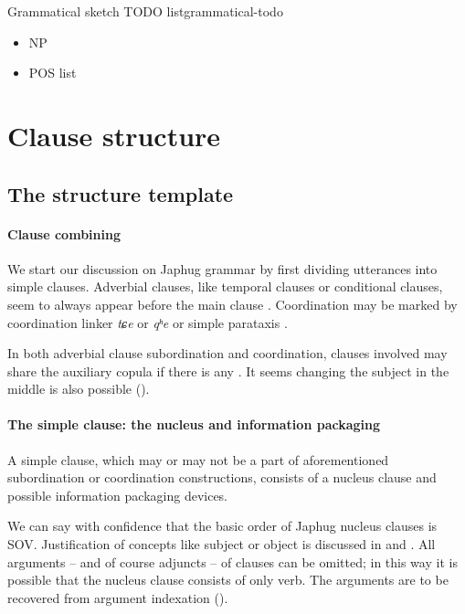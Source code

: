 \documentclass[a4paper, oneside, 12pt]{report}
\newcommand*{\citesec}[1]{\S~{#1}}
\newcommand*{\citechap}[1]{Ch~{#1}}
\newcommand*{\citepage}[1]{p.~{#1}}
\newcommand{\form}[1]{\emph{#1}}
\begin{document}
\begin{todobox}{Grammatical sketch TODO list}{grammatical-todo}
    \begin{itemize}
        \item NP
        \item POS list
    \end{itemize}
\end{todobox}

\section{Clause structure}\label{sec:grammatical.clause}

\subsection{The structure template}\label{sec:grammatical.clause.template}

\paragraph*{Clause combining}
We start our discussion on Japhug grammar 
by first dividing utterances into simple clauses.
Adverbial clauses, like temporal clauses or conditional clauses,
seem to always appear before the main clause \citep[\citechap{25}]{jacques2021grammar}.
Coordination may be marked by coordination linker \form{tɕe} or \form{qʰe} or simple parataxis
\citep[\citesec{25.1.6}]{jacques2021grammar}.

In both adverbial clause subordination and coordination,
clauses involved may share the auxiliary copula if there is any
\citep[\citepage{47}, (40); \citepage{1091}, (10)]{jacques2021grammar}.
It seems changing the subject in the middle is also possible
().

\paragraph*{The simple clause: the nucleus and information packaging}
\label{sec:grammatical.clause.template.nucleus-identification}
A simple clause, which may or may not be a part 
of aforementioned subordination or coordination constructions,
consists of a nucleus clause and possible information packaging devices.

We can say with confidence that the basic order of Japhug nucleus clauses is SOV.
Justification of concepts like subject or object is discussed in 
 and .
All arguments -- and of course adjuncts -- of clauses can be omitted;
in this way it is possible that the nucleus clause consists of only verb.
The arguments are to be recovered from argument indexation
().
\end{document}
